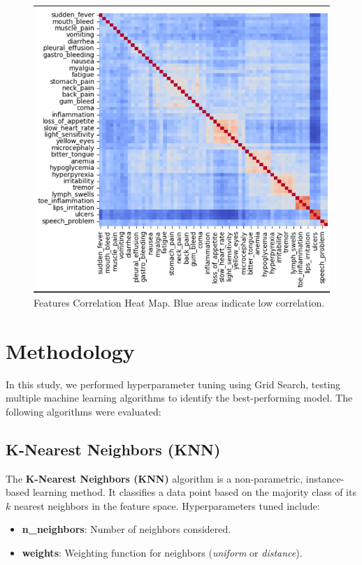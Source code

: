 \documentclass{article}
\begin{document}
\begin{figure}[h!]  
\centering
\includegraphics[width=1\linewidth]{CorrelationMatrix.png}
\caption{Features Correlation Heat Map. Blue areas indicate low correlation.}
\vspace{-1em} %
\end{figure}

\section{Methodology}
In this study, we performed hyperparameter tuning using Grid Search, testing multiple machine learning algorithms to identify the best-performing model. The following algorithms were evaluated:

\subsection{K-Nearest Neighbors (KNN)}
The \textbf{K-Nearest Neighbors (KNN)} algorithm is a non-parametric, instance-based learning method. It classifies a data point based on the majority class of its $k$ nearest neighbors in the feature space. Hyperparameters tuned include:
\begin{itemize}
    \item \textbf{n\_neighbors}: Number of neighbors considered.
    \item \textbf{weights}: Weighting function for neighbors (\textit{uniform} or \textit{distance}).
\end{itemize}
\end{document}
